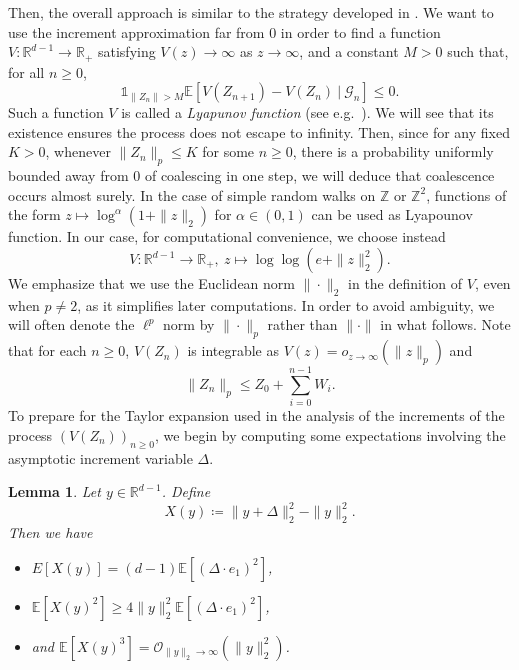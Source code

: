 \documentclass[a4paper, 11pt]{article}
\theoremstyle{plain}
\newtheorem{Lemma}[Theorem]{Lemma}
\theoremstyle{definition}
\newcommand{\E}{\mathbb{E}}
\newcommand{\R}{\mathbb{R}}
\newcommand{\Z}{\mathbb{Z}}
\numberwithin{equation}{section}
\begin{document}
Then, the overall approach is similar to the strategy developed in \cite[Section 4]{DiscreteDsf}. We want to use the increment approximation far from $0$ in order to find a function $V:\R^{d-1}\to\R_+$ satisfying $V(z)\to\infty$ as $z\to\infty$, and a constant $M>0$ such that, for all $n\geq0$,
    \[\mathds 1_{\|Z_n\|>M}\E[V(Z_{n+1})-V(Z_n)~\vert~\mathcal G_n]\leq 0.\]
Such a function $V$ is called a \emph{Lyapunov function} (see e.g.\ \cite{meyn2012markov}). We will see that its existence ensures the process does not escape to infinity. Then, since for any fixed $K>0$, whenever $\|Z_n\|_p\leq K$ for some $n\geq0$, there is a probability uniformly bounded away from $0$ of coalescing in one step, we will deduce that coalescence occurs almost surely. In the case of simple random walks on $\Z$ or $\Z^2$, functions of the form $z\mapsto\log^\alpha(1+\|z\|_2)$ for $\alpha\in(0,1)$ can be used as Lyapounov function. In our case, for computational convenience, we choose instead
    \begin{equation}
        \label{eq_def_V}
        V:\R^{d-1}\to\R_+,~z\mapsto\log\log(e+\|z\|_2^2).
    \end{equation}
We emphasize that we use the Euclidean norm $\|\cdot\|_2$ in the definition of $V$, even when $p\neq 2$, as it simplifies later computations. In order to avoid ambiguity, we will often denote the $\ell^p$ norm by $\|\cdot\|_p$ rather than $\|\cdot\|$ in what follows. Note that for each $n\geq 0$, $V(Z_n)$ is integrable as $V(z)=o_{z\to\infty}(\|z\|_p)$ and
    \[\|Z_n\|_p\leq Z_0+\sum_{i=0}^{n-1}W_i.\]
To prepare for the Taylor expansion used in the analysis of the increments of the process $(V(Z_n))_{n\geq0}$, we begin by computing some expectations involving the asymptotic increment variable $\Delta$.


\begin{Lemma}
    \label{lemma_moment_Xy}
    Let $y\in\R^{d-1}$. Define 
        \[X(y)\coloneqq\|y+\Delta\|_2^2-\|y\|_2^2.\]
    Then we have 
        \begin{itemize}
            \item $E[X(y)]=(d-1)\E[(\Delta\cdot e_1)^2]$,
            \item $\E[X(y)^2]\geq 4\|y\|_2^2\E[(\Delta\cdot e_1)^2]$,
            \item and $\E[X(y)^3]=\mathcal O_{\|y\|_2\to\infty}(\|y\|_2^2)$.
        \end{itemize}
\end{Lemma}
\end{document}
